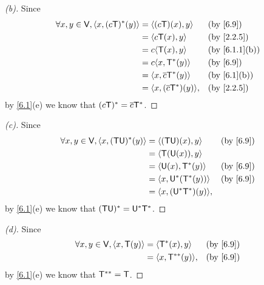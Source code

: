 \begin{proof}[(b)]
  Since
  \begin{align*}
    \forall x, y \in \V, \inn{x, (c \T)^*(y)} & = \inn{(c \T)(x), y}           &  & \by{6.9}      \\
                                              & = \inn{c \T(x), y}             &  & \by{2.2.5}    \\
                                              & = c \inn{\T(x), y}             &  & \by{6.1.1}[b] \\
                                              & = c \inn{x, \T^*(y)}           &  & \by{6.9}      \\
                                              & = \inn{x, \conj{c} \T^*(y)}    &  & \by{6.1}[b]   \\
                                              & = \inn{x, (\conj{c} \T^*)(y)}, &  & \by{2.2.5}
  \end{align*}
  by \cref{6.1}(e) we know that \((c \mathsf{T})^* = \overline{c} \mathsf{T}^*\).
\end{proof}

\begin{proof}[(c)]
  Since
  \begin{align*}
    \forall x, y \in \V, \inn{x, (\T \U)^*(y)} & = \inn{(\T \U)(x), y}      &  & \by{6.9} \\
                                               & = \inn{\T(\U(x)), y}                     \\
                                               & = \inn{\U(x), \T^*(y)}     &  & \by{6.9} \\
                                               & = \inn{x, \U^*(\T^*(y))}   &  & \by{6.9} \\
                                               & = \inn{x, (\U^* \T^*)(y)},
  \end{align*}
  by \cref{6.1}(e) we know that \((\mathsf{T} \mathsf{U})^* = \mathsf{U}^* \mathsf{T}^*\).
\end{proof}

\begin{proof}[(d)]
  Since
  \begin{align*}
    \forall x, y \in \V, \inn{x, \T(y)} & = \inn{\T^*(x), y}     &  & \by{6.9} \\
                                        & = \inn{x, \T^{**}(y)}, &  & \by{6.9}
  \end{align*}
  by \cref{6.1}(e) we know that \(\mathsf{T}^{**} = \mathsf{T}\).
\end{proof}

